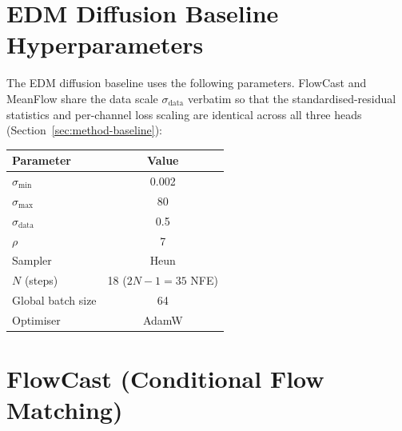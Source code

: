 
\label{app:hyperparams}

\section{EDM Diffusion Baseline Hyperparameters}

The EDM diffusion baseline uses the following parameters. FlowCast and MeanFlow share the data scale $\sigma_{\text{data}}$ verbatim so that the standardised-residual statistics and per-channel loss scaling are identical across all three heads (Section~\ref{sec:method-baseline}):
\begin{center}
\begin{tabular}{lc}
\toprule
Parameter & Value \\
\midrule
$\sigma_{\min}$ & 0.002 \\
$\sigma_{\max}$ & 80 \\
$\sigma_{\text{data}}$ & 0.5 \\
$\rho$ & 7 \\
Sampler & Heun \\
$N$ (steps) & 18 ($2N{-}1 = 35$ NFE) \\
Global batch size & 64 \\
Optimiser & AdamW \\
\bottomrule
\end{tabular}
\end{center}

\section{FlowCast (Conditional Flow Matching)}

